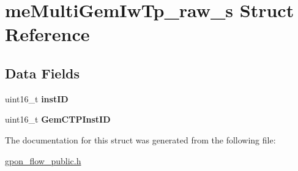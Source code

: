 \hypertarget{structmeMultiGemIwTp__raw__s}{}\section{me\+Multi\+Gem\+Iw\+Tp\+\_\+raw\+\_\+s Struct Reference}
\label{structmeMultiGemIwTp__raw__s}
\subsection*{Data Fields}
\begin{DoxyCompactItemize}
\item 
\mbox{\label{structmeMultiGemIwTp__raw__s_adb14db377169b5927d6b1aa1a112ab1d}} 
uint16\+\_\+t {\bfseries inst\+ID}
\item 
\mbox{\label{structmeMultiGemIwTp__raw__s_ae99b5defa15b70ee75ed581d52098f3b}} 
uint16\+\_\+t {\bfseries Gem\+C\+T\+P\+Inst\+ID}
\end{DoxyCompactItemize}


The documentation for this struct was generated from the following file\+:\begin{DoxyCompactItemize}
\item 
\hyperlink{gpon__flow__public_8h}{gpon\+\_\+flow\+\_\+public.\+h}\end{DoxyCompactItemize}
